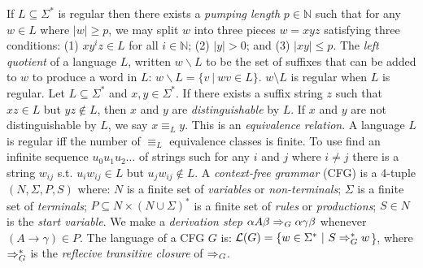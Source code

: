  If $L \subseteq \Sigma^*$ is regular then there exists a \textit{pumping length} $p \in \mathbb{N}$ such that for any $w \in L$ where $|w| \ge p$, we may split $w$ into three pieces $w = xyz$ satisfying three conditions: 
(1) $xy^iz \in L$ for all $i \in \mathbb{N}$; 
(2) $|y| > 0$; and 
(3) $|xy| \le p$.
 The \textit{left quotient} of a language $L$, written $w \backslash L$ to be the set of suffixes that can be added to $w$ to produce a word in $L$: $w \backslash L = \{v\ |\ wv \in L\}$. $w\setminus L$ is regular when $L$ is regular.
 Let $L \subseteq \Sigma^*$ and $x,y \in \Sigma^*$. If there exists a suffix string $z$ such that $xz \in L$ but $yz \notin L$, then $x$ and $y$ are \textit{distinguishable} by $L$. If $x$ and $y$ are not distinguishable by $L$, we say $x \equiv_L y$. This is an \textit{equivalence relation}.
 A language $L$ is regular iff the number of $\equiv_L$ equivalence classes is finite. To use find an infinite sequence $u_0 u_1 u_2 \ldots$ of strings such for any $i$ and $j$ where $i \ne j$ there is a string $w_{ij}$ s.t. $u_i w_{ij} \in L$ but $u_j w_{ij} \notin L$.
 A \textit{context-free grammar} (CFG) is a 4-tuple $(N, \Sigma, P, S)$ where: $N$ is a finite set of \textit{variables} or \textit{non-terminals}; $\Sigma$ is a finite set of \textit{terminals}; $P \subseteq N \times (N \cup \Sigma)^*$ is a finite set of \textit{rules} or \textit{productions}; $S \in N$ is the \textit{start variable}.
 We make a \textit{derivation step} $\alpha A\beta \Rightarrow_{G} \alpha \gamma \beta$ whenever $(A \to \gamma) \in P$. The language of a CFG $G$ is: $\mathcal{L}(G) = \{w \in \Sigma^*\ |\ S \Rightarrow_{G}^* w$\}, where $\Rightarrow_{G}^*$ is the \textit{reflecive transitive closure} of $\Rightarrow_{G}$.